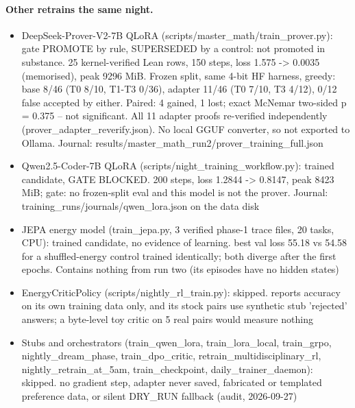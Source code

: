 \documentclass[11pt]{article}
\begin{document}
\paragraph{Other retrains the same night.}
\begin{itemize}
\item DeepSeek-Prover-V2-7B QLoRA (scripts/master\_math/train\_prover.py): gate PROMOTE by rule, SUPERSEDED by a control: not promoted in substance. 25 kernel-verified Lean rows, 150 steps, loss 1.575 -> 0.0035 (memorised), peak 9296 MiB. Frozen split, same 4-bit HF harness, greedy: base 8/46 (T0 8/10, T1-T3 0/36), adapter 11/46 (T0 7/10, T3 4/12), 0/12 false accepted by either. Paired: 4 gained, 1 lost; exact McNemar two-sided p = 0.375 -- not significant. All 11 adapter proofs re-verified independently (prover\_adapter\_reverify.json). No local GGUF converter, so not exported to Ollama. Journal: results/master\_math\_run2/prover\_training\_full.json
\item Qwen2.5-Coder-7B QLoRA (scripts/night\_training\_workflow.py): trained candidate, GATE BLOCKED. 200 steps, loss 1.2844 -> 0.8147, peak 8423 MiB; gate: no frozen-split eval and this model is not the prover. Journal: training\_runs/journals/qwen\_lora.json on the data disk
\item JEPA energy model (train\_jepa.py, 3 verified phase-1 trace files, 20 tasks, CPU): trained candidate, no evidence of learning. best val loss 55.18 vs 54.58 for a shuffled-energy control trained identically; both diverge after the first epochs. Contains nothing from run two (its episodes have no hidden states)
\item EnergyCriticPolicy (scripts/nightly\_rl\_train.py): skipped. reports accuracy on its own training data only, and its stock pairs use synthetic stub 'rejected' answers; a byte-level toy critic on 5 real pairs would measure nothing
\item Stubs and orchestrators (train\_qwen\_lora, train\_lora\_local, train\_grpo, nightly\_dream\_phase, train\_dpo\_critic, retrain\_multidisciplinary\_rl, nightly\_retrain\_at\_5am, train\_checkpoint, daily\_trainer\_daemon): skipped. no gradient step, adapter never saved, fabricated or templated preference data, or silent DRY\_RUN fallback (audit, 2026-09-27)
\end{itemize}
\end{document}
